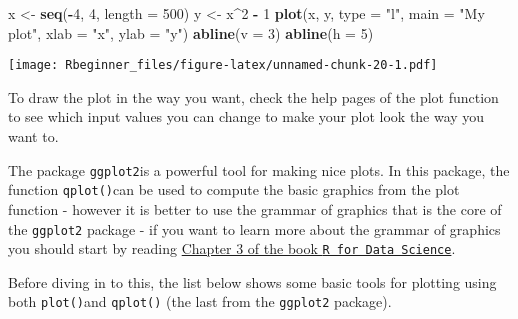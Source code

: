 \documentclass[]{article}
\newenvironment{Shaded}{\begin{snugshade}}{\end{snugshade}}
\newcommand{\KeywordTok}[1]{\textcolor[rgb]{0.13,0.29,0.53}{\textbf{#1}}}
\newcommand{\DataTypeTok}[1]{\textcolor[rgb]{0.13,0.29,0.53}{#1}}
\newcommand{\DecValTok}[1]{\textcolor[rgb]{0.00,0.00,0.81}{#1}}
\newcommand{\StringTok}[1]{\textcolor[rgb]{0.31,0.60,0.02}{#1}}
\newcommand{\OperatorTok}[1]{\textcolor[rgb]{0.81,0.36,0.00}{\textbf{#1}}}
\newcommand{\NormalTok}[1]{#1}
\begin{document}
\begin{Shaded}
\begin{Highlighting}[]
\NormalTok{x <-}\StringTok{ }\KeywordTok{seq}\NormalTok{(}\OperatorTok{-}\DecValTok{4}\NormalTok{, }\DecValTok{4}\NormalTok{, }\DataTypeTok{length =} \DecValTok{500}\NormalTok{)}
\NormalTok{y <-}\StringTok{ }\NormalTok{x}\OperatorTok{^}\DecValTok{2} \OperatorTok{-}\StringTok{ }\DecValTok{1}
\KeywordTok{plot}\NormalTok{(x, y, }\DataTypeTok{type =} \StringTok{"l"}\NormalTok{, }\DataTypeTok{main =} \StringTok{"My plot"}\NormalTok{, }\DataTypeTok{xlab =} \StringTok{"x"}\NormalTok{, }\DataTypeTok{ylab =} \StringTok{"y"}\NormalTok{)}
\KeywordTok{abline}\NormalTok{(}\DataTypeTok{v =} \DecValTok{3}\NormalTok{)}
\KeywordTok{abline}\NormalTok{(}\DataTypeTok{h =} \DecValTok{5}\NormalTok{)}
\end{Highlighting}
\end{Shaded}

\texttt{[image: Rbeginner\_files/figure-latex/unnamed-chunk-20-1.pdf]}

To draw the plot in the way you want, check the help pages of the plot
function to see which input values you can change to make your plot look
the way you want to.

The package \texttt{ggplot2}is a powerful tool for making nice plots. In
this package, the function \texttt{qplot()}can be used to compute the
basic graphics from the plot function - however it is better to use the
grammar of graphics that is the core of the \texttt{ggplot2} package -
if you want to learn more about the grammar of graphics you should start
by reading \href{http://r4ds.had.co.nz/data-visualisation.html}{Chapter
3 of the book \texttt{R\ for\ Data\ Science}}.

Before diving in to this, the list below shows some basic tools for
plotting using both \texttt{plot()}and \texttt{qplot()} (the last from
the \texttt{ggplot2} package).
\end{document}
